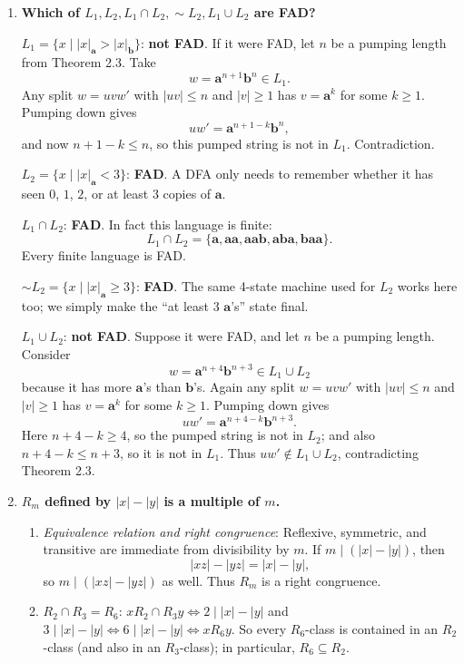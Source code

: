 \begin{enumerate}[{2.}1.]
\item \textbf{Which of $L_1,L_2,L_1\cap L_2,\sim L_2,L_1\cup L_2$ are FAD?}

$L_1=\{x\mid|x|_\mathbf{a}>|x|_\mathbf{b}\}$: \textbf{not FAD}. If it were FAD, let $n$ be a pumping length from Theorem 2.3. Take
\[
w=\mathbf{a}^{n+1}\mathbf{b}^n\in L_1.
\]
Any split $w=uvw'$ with $|uv|\le n$ and $|v|\ge1$ has $v=\mathbf{a}^k$ for some $k\ge1$.
Pumping down gives
\[
uw'=\mathbf{a}^{n+1-k}\mathbf{b}^n,
\]
and now $n+1-k\le n$, so this pumped string is not in $L_1$. Contradiction.

$L_2=\{x\mid|x|_\mathbf{a}<3\}$: \textbf{FAD}. A DFA only needs to remember whether it has seen $0$, $1$, $2$, or at least $3$ copies of $\mathbf a$.

$L_1\cap L_2$: \textbf{FAD}. In fact this language is finite:
\[
L_1\cap L_2=\{\mathbf a,\mathbf{aa},\mathbf{aab},\mathbf{aba},\mathbf{baa}\}.
\]
Every finite language is FAD.

$\sim L_2=\{x\mid|x|_\mathbf{a}\geq 3\}$: \textbf{FAD}. The same 4-state machine used for $L_2$ works here too; we simply make the ``at least 3 $\mathbf a$'s'' state final.

$L_1\cup L_2$: \textbf{not FAD}. Suppose it were FAD, and let $n$ be a pumping length. Consider
\[
w=\mathbf{a}^{n+4}\mathbf{b}^{n+3}\in L_1\cup L_2
\]
because it has more $\mathbf a$'s than $\mathbf b$'s.
Again any split $w=uvw'$ with $|uv|\le n$ and $|v|\ge1$ has $v=\mathbf{a}^k$ for some $k\ge1$.
Pumping down gives
\[
uw'=\mathbf{a}^{n+4-k}\mathbf{b}^{n+3}.
\]
Here $n+4-k\ge4$, so the pumped string is not in $L_2$; and also $n+4-k\le n+3$, so it is not in $L_1$.
Thus $uw'\notin L_1\cup L_2$, contradicting Theorem 2.3.

\item \textbf{$R_m$ defined by $|x|-|y|$ is a multiple of $m$.}

\begin{enumerate}
\item \textit{Equivalence relation and right congruence}: Reflexive, symmetric, and transitive are immediate from divisibility by $m$. If $m\mid(|x|-|y|)$, then
\[
|xz|-|yz|=|x|-|y|,
\]
so $m\mid(|xz|-|yz|)$ as well. Thus $R_m$ is a right congruence.

\item $R_2\cap R_3 = R_6$: $x R_2\cap R_3 y\Leftrightarrow 2\mid|x|-|y|$ and $3\mid|x|-|y|\Leftrightarrow 6\mid|x|-|y|\Leftrightarrow x R_6 y$.
So every $R_6$-class is contained in an $R_2$-class (and also in an $R_3$-class); in particular, $R_6\subseteq R_2$.


\end{enumerate}
\end{enumerate}
